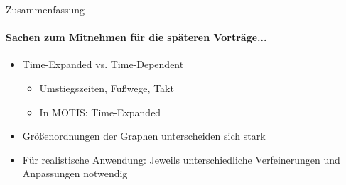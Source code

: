 %	



\begin{frame}{Zusammenfassung}
	\framesubtitle{Sachen zum Mitnehmen für die späteren Vorträge...}
	\begin{itemize}
		\item Time-Expanded vs. Time-Dependent
		\begin{itemize}
			\item Umstiegszeiten, Fußwege, Takt
			\item In MOTIS: Time-Expanded
		\end{itemize}
		\item Größenordnungen der Graphen unterscheiden sich stark
		\item Für realistische Anwendung: Jeweils unterschiedliche Verfeinerungen und Anpassungen notwendig
	\end{itemize}

\end{frame}

